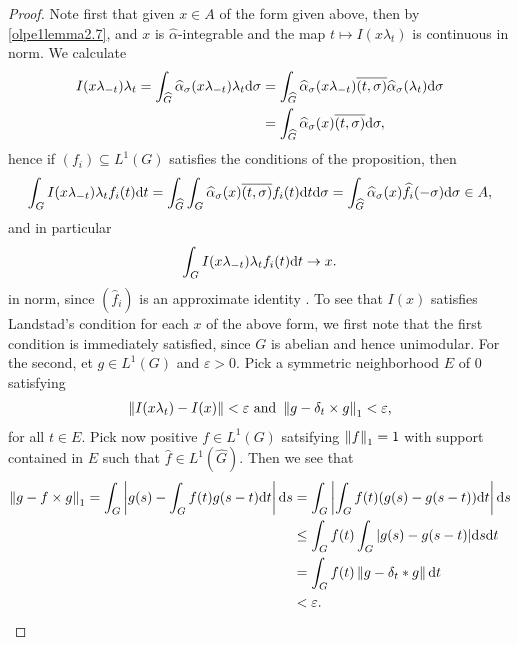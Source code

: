 \begin{proof}
	Note first that given $x \in A$ of the form given above, then by \cref{olpe1lemma2.7}, and $x$ is $\hat \alpha$-integrable and the map $t \mapsto I(x \lambda_t)$ is continuous in norm. We calculate
	\begin{align*}
		I(x\lambda_{-t}) \lambda_t = \int_{\widehat{G}} \widehat{\alpha}_\sigma(x \lambda_{-t}) \lambda_t \mathrm{d} \sigma &= \int_{\widehat{G}} \widehat{\alpha}_\sigma(x \lambda_{-t}) \overline{(t,\sigma)} \widehat{\alpha}_\sigma(\lambda_t) \mathrm{d} \sigma\\
		&= \int_{\widehat{G}} \widehat{\alpha}_\sigma(x) \overline{(t,\sigma)} \mathrm{d} \sigma,
	\end{align*}
	hence if $(f_i) \subseteq L^1(G)$ satisfies the conditions of the proposition, then
	\begin{align*}
		\int_{G}I(x \lambda_{-t}) \lambda_t f_i(t) \mathrm{d} t = \int_{\widehat{G}} \int_G \widehat{\alpha}_\sigma(x) \overline{(t,\sigma)} f_i(t) \mathrm{d} t \mathrm{d} \sigma = \int_{\widehat{G}} \widehat{\alpha}_\sigma (x) \widehat{f}_i(-\sigma) \mathrm{d} \sigma \in A,
	\end{align*}
	and in particular
	\begin{align*}
		\int_G I(x \lambda_{-t}) \lambda_t f_i(t) \mathrm{d} t \to x.
	\end{align*}
	in norm, since $(\hat f_i)$ is an approximate identity . To see that $I\left( x \right)$ satisfies Landstad's condition for each $x$ of the above form, we first note that the first condition is immediately satisfied, since $G$ is abelian and hence unimodular. For the second, et $g \in L^1(G)$ and $\varepsilon > 0$. Pick a symmetric neighborhood $E$ of $0$ satisfying
	\begin{align*}
		\left\lVert I(x \lambda_t) - I(x) \right\rVert<\varepsilon \text{ and } \left\lVert g - \delta_t \times g \right\rVert_1 < \varepsilon,
	\end{align*}
	for all $t \in E$. Pick now positive $f \in L^1(G)$ satsifying $\left\lVert f \right\rVert_1 = 1$ with support contained in $E$ such that $\hat f \in L^1 (\hat G)$. Then we see that
	\begin{align*}
		\left\lVert g - f \times g \right\rVert_1 = \int_G \left|g(s) - \int_G f(t) g(s-t) \mathrm{d} t\right| \mathrm{d} s &= \int_G \left | \int_G f(t)(g(s)-g(s-t)) \mathrm{d} t \right| \mathrm{d} s \\
		&\leq \int_G f(t) \int_G | g(s) - g(s-t)| \mathrm{d} s \mathrm{d} t\\
		& = \int_G f(t) \left\lVert g - \delta_t \ast g \right\rVert \mathrm{d} t \\
		&< \varepsilon.
	\end{align*}

\end{proof}
